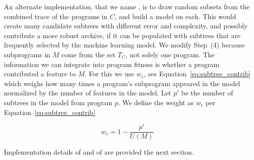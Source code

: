 An alternate implementation, that we name \DRAW,  is to draw random subsets from the combined trace of the programs in $C$, and build a model on each.  This would create many candidate subtrees with different error and complexity, and possibly contribute a more robust archive, if it can be populated with subtrees that are frequently selected by the machine learning model.  We modify Step~(4) because subprograms in $M$ come from the set $T_C$, not solely one program. The information we can integrate into program fitness is whether a program contributed a feature to $M$. For this we use $w_c$, see Equation~\ref{eq:subtree_contrib} which weighs how many times a program's subprogram appeared in the model normalized by the number of features in the model. Let $p'$ be the number of subtrees in the model from program $p$.  We define the weight as $w_c$ per Equation~\ref{eq:subtree_contrib}


\begin{equation}
\label{eq:subtree_contrib}
w_c = 1 - \frac{p'}{U(M)}
\end{equation}

Implementation details of \FULL and of \DRAW are provided the next section.  



